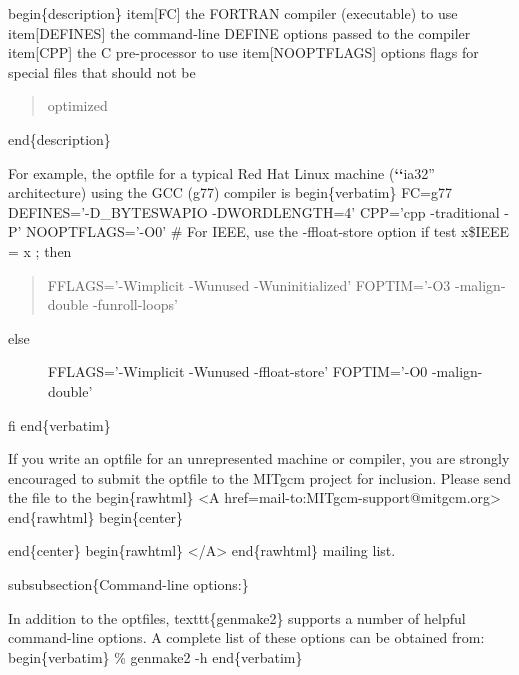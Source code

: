 \documentclass[letterpaper,10pt,english]{sphinxmanual}
\begin{document}
begin\{description\}
item{[}FC{]} the FORTRAN compiler (executable) to use
item{[}DEFINES{]} the command-line DEFINE options passed to the compiler
item{[}CPP{]} the C pre-processor to use
item{[}NOOPTFLAGS{]} options flags for special files that should not be
\begin{quote}

optimized
\end{quote}

end\{description\}

For example, the optfile for a typical Red Hat Linux machine ({\color{red}\bfseries{}{}`{}`}ia32''
architecture) using the GCC (g77) compiler is
begin\{verbatim\}
FC=g77
DEFINES='-D\_BYTESWAPIO -DWORDLENGTH=4'
CPP='cpp  -traditional -P'
NOOPTFLAGS='-O0'
\#  For IEEE, use the \sphinxquotedblleft{}-ffloat-store\sphinxquotedblright{} option
if test \sphinxquotedblleft{}x\$IEEE\sphinxquotedblright{} = x ; then
\begin{quote}

FFLAGS='-Wimplicit -Wunused -Wuninitialized'
FOPTIM='-O3 -malign-double -funroll-loops'
\end{quote}
\begin{description}
\item[{else}] \leavevmode
FFLAGS='-Wimplicit -Wunused -ffloat-store'
FOPTIM='-O0 -malign-double'

\end{description}

fi
end\{verbatim\}

If you write an optfile for an unrepresented machine or compiler, you
are strongly encouraged to submit the optfile to the MITgcm project
for inclusion.  Please send the file to the
begin\{rawhtml\} \textless{}A href=\sphinxquotedblright{}mail-to:MITgcm-support@mitgcm.org\sphinxquotedblright{}\textgreater{} end\{rawhtml\}
begin\{center\}
\begin{quote}

\end{quote}

end\{center\}
begin\{rawhtml\} \textless{}/A\textgreater{} end\{rawhtml\}
mailing list.

subsubsection\{Command-line options:\}

In addition to the optfiles, texttt\{genmake2\} supports a number of
helpful command-line options.  A complete list of these options can be
obtained from:
begin\{verbatim\}
\% genmake2 -h
end\{verbatim\}
\end{document}
